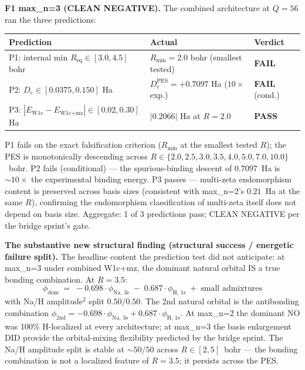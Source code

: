 \documentclass[aps,pra,twocolumn,superscriptaddress,longbibliography]{revtex4-2}
\begin{document}
\textbf{F1 max\_n=3 (CLEAN NEGATIVE).} The combined architecture at
$Q = 56$ ran the three predictions:

\begin{center}
\begin{tabular}{lll}
\hline
Prediction & Actual & Verdict \\
\hline
P1: internal min $R_\text{eq} \in [3.0, 4.5]$ bohr & $R_\text{min} = 2.0$ bohr (smallest tested) & \textbf{FAIL} \\
P2: $D_e \in [0.0375, 0.150]$ Ha & $D_e^\text{PES} = +0.7097$ Ha ($10\times$ exp.) & \textbf{FAIL} (cond.) \\
P3: $|E_\text{W1c} - E_\text{W1c+mz}| \in [0.02, 0.30]$ Ha & $|0.2066|$ Ha at $R = 2.0$ & \textbf{PASS} \\
\hline
\end{tabular}
\end{center}

P1 fails on the exact falsification criterion ($R_\text{min}$ at the
smallest tested $R$); the PES is monotonically descending across
$R \in \{2.0, 2.5, 3.0, 3.5, 4.0, 5.0, 7.0, 10.0\}$~bohr. P2 fails
(conditional) — the spurious-binding descent of $0.7097$~Ha is $\sim 10\times$
the experimental binding energy. P3 passes — multi-zeta endomorphism
content is preserved across basis sizes (consistent with max\_n=2's
$0.21$~Ha at the same $R$), confirming the endomorphism classification
of multi-zeta itself does not depend on basis size. Aggregate: 1 of 3
predictions pass; CLEAN NEGATIVE per the bridge sprint's gate.

\textbf{The substantive new structural finding (structural success /
energetic failure split).} The headline content the prediction test did
not anticipate: at max\_n=3 under combined W1c+mz, the dominant natural
orbital IS a true bonding combination. At $R = 3.5$:
\[
  \phi_\text{dom}
    \;=\; -0.698 \cdot \phi_\text{Na, 3s}
       \;-\; 0.687 \cdot \phi_\text{H, 1s}
       \;+\; \text{small admixtures}
\]
with Na/H amplitude$^2$ split $0.50/0.50$. The 2nd natural orbital is
the antibonding combination
$\phi_\text{2nd} = -0.698 \cdot \phi_\text{Na, 3s} + 0.687 \cdot \phi_\text{H, 1s}$.
At max\_n=2 the dominant NO was 100\% H-localized at every architecture;
at max\_n=3 the basis enlargement DID provide the orbital-mixing
flexibility predicted by the bridge sprint. The Na/H amplitude split is
stable at ${\sim}50/50$ across $R \in [2, 5]$~bohr --- the bonding
combination is not a localized feature of $R = 3.5$; it persists across
the PES.
\end{document}
